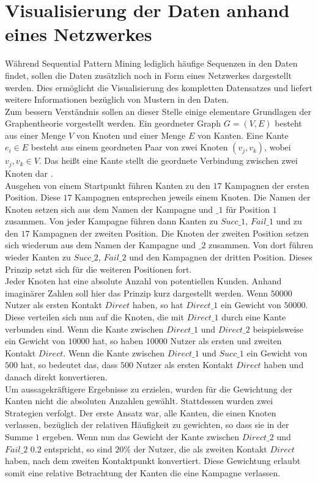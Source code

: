 \section{Visualisierung der Daten anhand eines Netzwerkes}\label{network}

Während Sequential Pattern Mining lediglich häufige Sequenzen in den Daten findet, sollen die Daten zusätzlich noch in Form eines Netzwerkes dargestellt werden. Dies ermöglicht die Visualisierung des kompletten Datensatzes und liefert weitere Informationen bezüglich von Mustern in den Daten.\\
Zum bessern Verständnis sollen an dieser Stelle einige elementare Grundlagen der Graphentheorie vorgestellt werden. Ein geordneter Graph $G=(V,E)$ besteht aus einer Menge $V$ von Knoten und einer Menge $E$ von Kanten. Eine Kante $e_i \in E$ besteht aus einem geordneten Paar von zwei Knoten $(v_j,v_k)$, wobei $v_j,v_k \in V$. Das heißt eine Kante stellt die geordnete Verbindung zwischen zwei Knoten dar \cite[16]{network_data}.\\
Ausgehen von einem Startpunkt führen Kanten zu den $17$ Kampagnen der ersten Position. Diese $17$ Kampagnen entsprechen jeweils einem Knoten. Die Namen der Knoten setzen sich aus dem Namen der Kampagne und $\_1$ für Position $1$ zusammen. Von jeder Kampagne führen dann Kanten zu $Succ\_1$, $Fail\_1$ und zu den $17$ Kampagnen der zweiten Position. Die Knoten der zweiten Position setzen sich wiederum aus dem Namen der Kampagne und $\_2$ zusammen. Von dort führen wieder Kanten zu $Succ\_2$, $Fail\_2$ und den Kampagnen der dritten Position. Dieses Prinzip setzt sich für die weiteren Positionen fort.\\
Jeder Knoten hat eine absolute Anzahl von potentiellen Kunden. Anhand imaginärer Zahlen soll hier das Prinzip kurz dargestellt werden. Wenn $50000$ Nutzer als ersten Kontakt $Direct$ haben, so hat $Direct\_1$ ein Gewicht von $50000$. Diese verteilen sich nun auf die Knoten, die mit $Direct\_1$ durch eine Kante verbunden sind. Wenn die Kante zwischen $Direct\_1$ und $Direct\_2$ beispielsweise ein Gewicht von $10000$ hat, so haben $10000$ Nutzer als ersten und zweiten Kontakt $Direct$. Wenn die Kante zwischen $Direct\_1$ und $Succ\_1$ ein Gewicht von $500$ hat, so bedeutet das, dass $500$ Nutzer als ersten Kontakt $Direct$ haben und danach direkt konvertieren.\\
Um aussagekräftigere Ergebnisse zu erzielen, wurden für die Gewichtung der Kanten nicht die absoluten Anzahlen gewählt. Stattdessen wurden zwei Strategien verfolgt. Der erste Ansatz war, alle Kanten, die einen Knoten verlassen, bezüglich der relativen Häufigkeit zu gewichten, so dass sie in der Summe $1$ ergeben. Wenn nun das Gewicht der Kante zwischen $Direct\_2$ und $Fail\_2$ $0.2$ entspricht, so sind $20 \%$ der Nutzer, die als zweiten Kontakt $Direct$ haben, nach dem zweiten Kontaktpunkt konvertiert. Diese Gewichtung erlaubt somit eine relative Betrachtung der Kanten die eine Kampagne verlassen.\\
